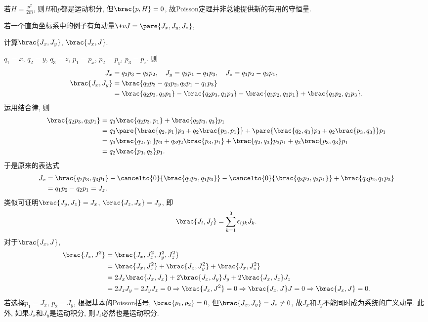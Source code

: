 \documentclass{ctexart}
\begin{document}
\begin{ex}
    若$\displaystyle H = \frac{p^2}{2m}$, 则$H$和$p$都是运动积分, 但$\brac{p,H} = 0$, 故Poisson定理并非总能提供新的有用的守恒量.
\end{ex}
\begin{sample}
    \begin{ex}
        若一个直角坐标系中的例子有角动量$\+vJ = \pare{J_x,J_y,J_z}$,
        \begin{cenum}
            \item 计算$\brac{J_x,J_y}$, $\brac{J_x,J}$.
        \end{cenum}
    \end{ex}
    \begin{solution}
        $q_1 = x$, $q_2 = y$, $q_3 = z$, $p_1 = p_x$, $p_2 = p_y$, $p_3 = p_z$. 则
        \begin{align*}
            J_x &= q_2p_3 - q_3p_2,\quad J_y = q_3p_1 - q_1p_3,\quad J_z = q_1p_2 - q_2 p_1, \\
            \brac{J_x,J_y} &= \brac{q_2p_3 - q_3p_2, q_3p_1 - q_1p_3} \\
            &= \brac{q_2p_3,q_3p_1} - \brac{q_2p_3,q_1p_3} - \brac{q_3p_2,q_3p_1} + \brac{q_3p_2,q_1p_3}.
        \end{align*}
        运用结合律, 则
        \begin{align*}
            \brac{q_2p_3,q_3p_1} &= q_3\brac{q_2p_3,p_1} + \brac{q_2p_3,q_3}p_1 \\
            &= q_3\pare{\brac{q_2,p_1}p_3 + q_2\brac{p_3,p_1}} + \pare{\brac{q_2,q_3}p_3 + q_2\brac{p_3,q_3}}p_1 \\
            &= q_3\brac{q_2,q_1}p_3 + q_3q_2\brac{p_3,p_1} + \brac{q_2,q_3}p_3p_1 + q_2\brac{p_3,q_3}p_1 \\
            &= q_2\brac{p_3,q_3}p_1.
        \end{align*}
        于是原来的表达式
        \begin{align*}
            J_x &= {\brac{q_2p_3,q_3p_1}} - \cancelto{0}{\brac{q_2p_3,q_1p_3}} - \cancelto{0}{\brac{q_3p_2,q_3p_1}} + {\brac{q_3p_2,q_1p_3}} \\
            &= q_1p_2 - q_2p_1 = J_z.
        \end{align*}
        类似可证明$\brac{J_y,J_z} = J_x$, $\brac{J_z,J_x} = J_y$, 即
        \[ \brac{J_i,J_j} = \sum_{k=1}^3 \epsilon_{ijk}J_k. \]
        对于$\brac{J_x,J}$,
        \begin{align*}
            \brac{J_x,J^2} &= \brac{J_x,J_x^2,J_y^2,J_z^2} \\
            &= \brac{J_x,J_x^2} + \brac{J_x,J_y^2} + \brac{J_x,J_z^2} \\
            &= 2J_x\brac{J_x,J_x} + 2\brac{J_x,J_y}J_y + 2\brac{J_x,J_z}J_z \\
            &= 2J_zJ_y - 2J_yJ_z = 0 \Rightarrow \brac{J_x,J^2} = 0 \Rightarrow \brac{J_x,J}J = 0\Rightarrow \brac{J_x,J} = 0.
        \end{align*}
        若选择$p_1=J_x$, $p_2=J_y$, 根据基本的Poisson括号, $\brac{p_1,p_2} = 0$, 但$\brac{J_x,J_y} = J_z\neq 0$, 故$J_x$和$J_y$不能同时成为系统的广义动量. 此外, 如果$J_x$和$J_y$是运动积分, 则$J_z$必然也是运动积分.
    \end{solution}
\end{sample}
\end{document}

